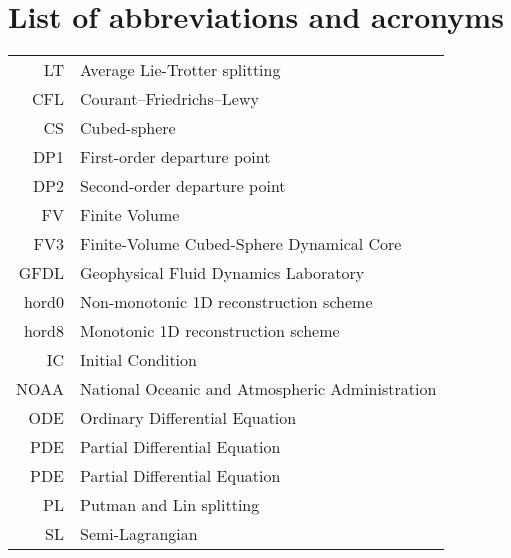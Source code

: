 \documentclass[12pt,twoside,english]{book}
\begin{document}
\newcommand\disablenewpage[1]{{\let\clearpage\par\let\cleardoublepage\par #1}}

\bgroup
\raggedbottom


\chapter*{List of abbreviations and acronyms}

\begin{tabular}{rl}
   LT & Average Lie-Trotter splitting \\
   CFL & Courant–Friedrichs–Lewy \\
   CS & Cubed-sphere \\
   DP1 & First-order departure point\\
   DP2 & Second-order departure point\\
   FV & Finite Volume\\
   FV3 & Finite-Volume Cubed-Sphere Dynamical Core \\
   GFDL & Geophysical Fluid Dynamics Laboratory\\
   hord0 & Non-monotonic 1D reconstruction scheme \\
   hord8 & Monotonic 1D reconstruction scheme\\
   IC & Initial Condition \\
   NOAA & National Oceanic and Atmospheric Administration\\
   ODE & Ordinary Differential Equation\\
   PDE & Partial Differential Equation\\
   PDE & Partial Differential Equation\\
   PL & Putman and Lin splitting \\
   SL  & Semi-Lagrangian\\
\end{tabular}
\end{document}
